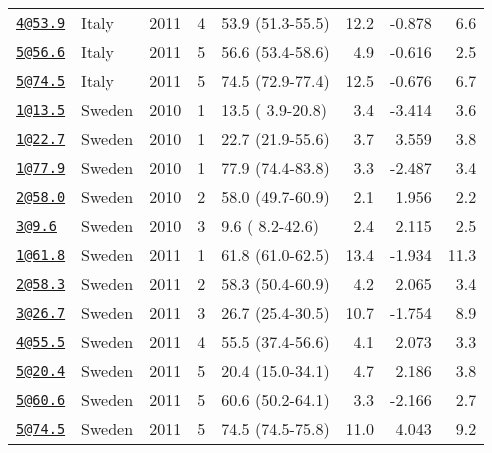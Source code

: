 \documentclass[]{article}
\begin{document}
\begin{longtable}[]{@{}llrrlrrr@{}}
\href{mailto:4@53.9}{\nolinkurl{4@53.9}} & Italy & 2011 & 4 & 53.9 (51.3-55.5) & 12.2 & -0.878 & 6.6\tabularnewline
\href{mailto:5@56.6}{\nolinkurl{5@56.6}} & Italy & 2011 & 5 & 56.6 (53.4-58.6) & 4.9 & -0.616 & 2.5\tabularnewline
\href{mailto:5@74.5}{\nolinkurl{5@74.5}} & Italy & 2011 & 5 & 74.5 (72.9-77.4) & 12.5 & -0.676 & 6.7\tabularnewline
\href{mailto:1@13.5}{\nolinkurl{1@13.5}} & Sweden & 2010 & 1 & 13.5 ( 3.9-20.8) & 3.4 & -3.414 & 3.6\tabularnewline
\href{mailto:1@22.7}{\nolinkurl{1@22.7}} & Sweden & 2010 & 1 & 22.7 (21.9-55.6) & 3.7 & 3.559 & 3.8\tabularnewline
\href{mailto:1@77.9}{\nolinkurl{1@77.9}} & Sweden & 2010 & 1 & 77.9 (74.4-83.8) & 3.3 & -2.487 & 3.4\tabularnewline
\href{mailto:2@58.0}{\nolinkurl{2@58.0}} & Sweden & 2010 & 2 & 58.0 (49.7-60.9) & 2.1 & 1.956 & 2.2\tabularnewline
\href{mailto:3@9.6}{\nolinkurl{3@9.6}} & Sweden & 2010 & 3 & 9.6 ( 8.2-42.6) & 2.4 & 2.115 & 2.5\tabularnewline
\href{mailto:1@61.8}{\nolinkurl{1@61.8}} & Sweden & 2011 & 1 & 61.8 (61.0-62.5) & 13.4 & -1.934 & 11.3\tabularnewline
\href{mailto:2@58.3}{\nolinkurl{2@58.3}} & Sweden & 2011 & 2 & 58.3 (50.4-60.9) & 4.2 & 2.065 & 3.4\tabularnewline
\href{mailto:3@26.7}{\nolinkurl{3@26.7}} & Sweden & 2011 & 3 & 26.7 (25.4-30.5) & 10.7 & -1.754 & 8.9\tabularnewline
\href{mailto:4@55.5}{\nolinkurl{4@55.5}} & Sweden & 2011 & 4 & 55.5 (37.4-56.6) & 4.1 & 2.073 & 3.3\tabularnewline
\href{mailto:5@20.4}{\nolinkurl{5@20.4}} & Sweden & 2011 & 5 & 20.4 (15.0-34.1) & 4.7 & 2.186 & 3.8\tabularnewline
\href{mailto:5@60.6}{\nolinkurl{5@60.6}} & Sweden & 2011 & 5 & 60.6 (50.2-64.1) & 3.3 & -2.166 & 2.7\tabularnewline
\href{mailto:5@74.5}{\nolinkurl{5@74.5}} & Sweden & 2011 & 5 & 74.5 (74.5-75.8) & 11.0 & 4.043 & 9.2\tabularnewline
\bottomrule
\end{longtable}

\newpage
\end{document}
